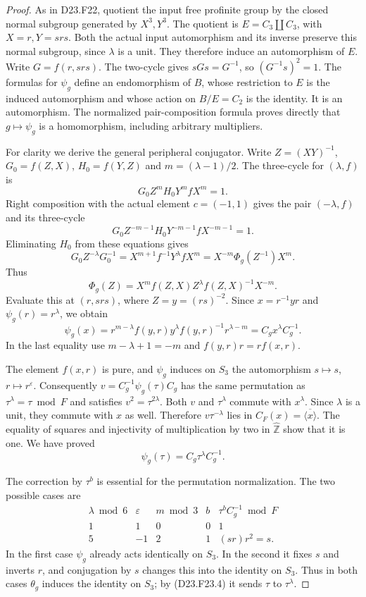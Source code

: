 \begin{proof}
As in \textup{D23.F22}, quotient the input free profinite group by
the closed normal subgroup generated by $X^3,Y^3$. The quotient
is $E=C_3\amalg C_3$, with $X=r,Y=srs$. Both the actual input
automorphism and its inverse preserve this normal subgroup, since
$\lambda$ is a unit. They therefore induce an automorphism of $E$.
Write $G=f(r,srs)$. The two-cycle gives $sGs=G^{-1}$, so
$(G^{-1}s)^2=1$. The formulas for $\psi_g$ define an endomorphism
of $B$, whose restriction to $E$ is the induced automorphism and
whose action on $B/E=C_2$ is the identity. It is an automorphism.
The normalized pair-composition formula proves directly that
$g\mapsto\psi_g$ is a homomorphism, including arbitrary multipliers.

For clarity we derive the general peripheral conjugator. Write
$Z=(XY)^{-1}$, $G_0=f(Z,X)$, $H_0=f(Y,Z)$ and
$m=(\lambda-1)/2$. The three-cycle for $(\lambda,f)$ is
\[
 G_0 Z^m H_0 Y^m f X^m=1.
\]
Right composition with the actual element $c=(-1,1)$ gives the
pair $(-\lambda,f)$ and its three-cycle
\[
 G_0 Z^{-m-1}H_0Y^{-m-1}fX^{-m-1}=1.
\]
Eliminating $H_0$ from these equations gives
\[
 G_0Z^{-\lambda}G_0^{-1}
   =X^{m+1}f^{-1}Y^\lambda fX^m
   =X^{-m}\Phi_g(Z^{-1})X^m.
\]
Thus
\[
 \Phi_g(Z)=X^m f(Z,X)Z^\lambda f(Z,X)^{-1}X^{-m}.             \tag{D23.F23.3}
\]
Evaluate this at $(r,srs)$, where $Z=y=(rs)^{-2}$.
Since $x=r^{-1}yr$ and $\psi_g(r)=r^\lambda$, we obtain
\[
 \psi_g(x)=r^{m-\lambda}f(y,r)y^\lambda f(y,r)^{-1}r^{\lambda-m}
          =C_g x^\lambda C_g^{-1}.
\]
In the last equality use $m-\lambda+1=-m$ and
$f(y,r)r=rf(x,r)$.

The element $f(x,r)$ is pure, and $\psi_g$ induces on $S_3$
the automorphism $s\mapsto s$, $r\mapsto r^\varepsilon$.
Consequently $v=C_g^{-1}\psi_g(\tau)C_g$ has the same
permutation as $\tau^\lambda=\tau\bmod F$ and satisfies
$v^2=\tau^{2\lambda}$.
Both $v$ and $\tau^\lambda$ commute with $x^\lambda$.
Since $\lambda$ is a unit, they commute with $x$ as well.
Therefore $v\tau^{-\lambda}$ lies in
$C_F(x)=\overline{\langle x\rangle}$.
The equality of squares and injectivity of multiplication by two
in $\widehat{\mathbb Z}$ show that it is one. We have proved
\[
 \psi_g(\tau)=C_g\tau^\lambda C_g^{-1}.
                                                               \tag{D23.F23.4}
\]

The correction by $\tau^b$ is essential for the permutation
normalization. The two possible cases are
\[
\begin{array}{c|c|c|c|c}
 \lambda\bmod6&\varepsilon&m\bmod3&b&
       \tau^b C_g^{-1}\bmod F\\\hline
 1&1&0&0&1\\
 5&-1&2&1&(sr)r^2=s.
\end{array}
\]
In the first case $\psi_g$ already acts identically on $S_3$.
In the second it fixes $s$ and inverts $r$, and conjugation by
$s$ changes this into the identity on $S_3$. Thus in both cases
$\theta_g$ induces the identity on $S_3$; by (D23.F23.4) it
sends $\tau$ to $\tau^\lambda$.


\end{proof}
